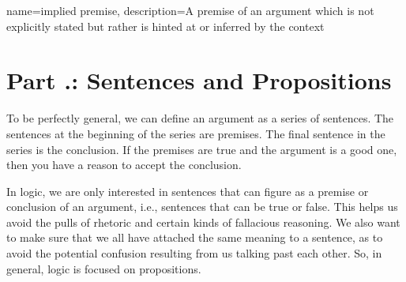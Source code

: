 {
name=implied premise,
description={A premise of an argument which is not explicitly stated but rather is hinted at or inferred by the context}
}


\section{Part \thechapcount.\theseccount: Sentences and Propositions}
\label{Some Basics from Philosophy of Language}

To be perfectly general, we can define an \gls{argument} as a series of sentences. The sentences at the beginning of the series are premises. The final sentence in the series is the conclusion. If the premises are true and the argument is a good one, then you have a reason to accept the conclusion.

In logic, we are only interested in sentences that can figure as a premise or conclusion of an argument, i.e., sentences that can be true or false. This helps us avoid the pulls of rhetoric and certain kinds of fallacious reasoning. We also want to make sure that we all have attached the same meaning to a sentence, as to avoid the potential confusion resulting from us talking past each other. So, in general, logic is focused on propositions.

